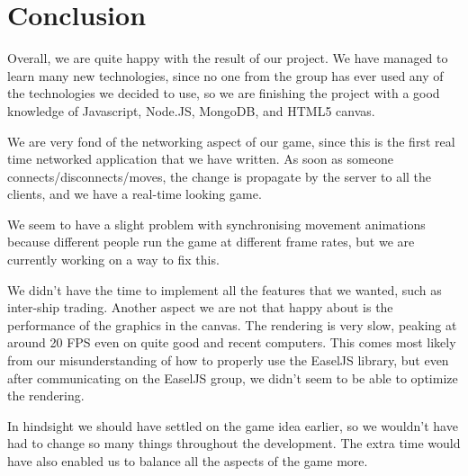 \documentclass[a4paper,11pt]{article}
\begin{document}
	\section{Conclusion}
	Overall, we are quite happy with the result of our project. We have managed to learn many new technologies, since no one from the group has ever used any of the technologies we decided to use, so we are finishing the project with a good knowledge of Javascript, Node.JS, MongoDB, and HTML5 canvas.
	
	We are very fond of the networking aspect of our game, since this is the first real time networked application that we have written. As soon as someone connects/disconnects/moves, the change is propagate by the server to all the clients, and we have a real-time looking game. 
	
	We seem to have a slight problem with synchronising movement animations because different people run the game at different frame rates, but we are currently working on a way to fix this.
	
	We didn't have the time to implement all the features that we wanted, such as inter-ship trading. Another aspect we are not that happy about is the performance of the graphics in the canvas. The rendering is very slow, peaking at around 20 FPS even on quite good and recent computers. This comes most likely from our misunderstanding of how to properly use the EaselJS library, but even after communicating on the EaselJS group, we didn't seem to be able to optimize the rendering.
	
	In hindsight we should have settled on the game idea earlier, so we wouldn't have had to change so many things throughout the development. The extra time would have also enabled us to balance all the aspects of the game more.
\end{document}

